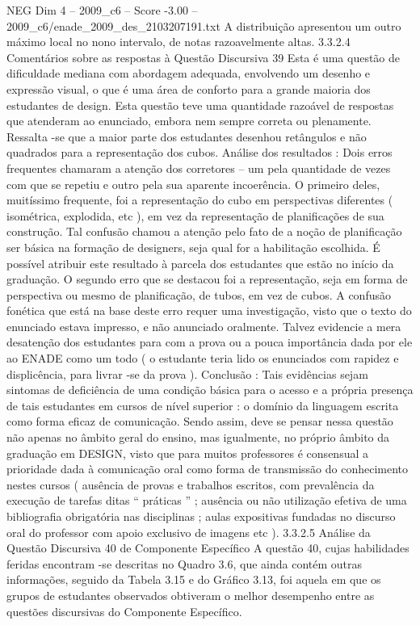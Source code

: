\begin{textsample}{NEG Dim 4 – 2009\_c6 – Score -3.00 – 2009\_c6/enade\_2009\_des\_2103207191.txt}
A distribuição apresentou um outro máximo local no nono intervalo, de notas razoavelmente altas. 3.3.2.4 Comentários sobre as respostas à Questão Discursiva 39 Esta é uma questão de dificuldade mediana com abordagem adequada, envolvendo um desenho e expressão visual, o que é uma área de conforto para a grande maioria dos estudantes de design.
Esta questão teve uma quantidade razoável de respostas que atenderam ao enunciado, embora nem sempre correta ou plenamente.
Ressalta -se que a maior parte dos estudantes desenhou retângulos e não quadrados para a representação dos cubos.
Análise dos resultados : Dois erros frequentes chamaram a atenção dos corretores – um pela quantidade de vezes com que se repetiu e outro pela sua aparente incoerência.
O primeiro deles, muitíssimo frequente, foi a representação do cubo em perspectivas diferentes ( isométrica, explodida, etc ), em vez da representação de planificações de sua construção.
Tal confusão chamou a atenção pelo fato de a noção de planificação ser básica na formação de designers, seja qual for a habilitação escolhida.
É possível atribuir este resultado à parcela dos estudantes que estão no início da graduação.
O segundo erro que se destacou foi a representação, seja em forma de perspectiva ou mesmo de planificação, de tubos, em vez de cubos.
A confusão fonética que está na base deste erro requer uma investigação, visto que o texto do enunciado estava impresso, e não anunciado oralmente.
Talvez evidencie a mera desatenção dos estudantes para com a prova ou a pouca importância dada por ele ao ENADE como um todo ( o estudante teria lido os enunciados com rapidez e displicência, para livrar -se da prova ).
Conclusão : Tais evidências sejam sintomas de deficiência de uma condição básica para o acesso e a própria presença de tais estudantes em cursos de nível superior : o domínio da linguagem escrita como forma eficaz de comunicação.
Sendo assim, deve se pensar nessa questão não apenas no âmbito geral do ensino, mas igualmente, no próprio âmbito da graduação em DESIGN, visto que para muitos professores é consensual a prioridade dada à comunicação oral como forma de transmissão do conhecimento nestes cursos ( ausência de provas e trabalhos escritos, com prevalência da execução de tarefas ditas “ práticas ” ; ausência ou não utilização efetiva de uma bibliografia obrigatória nas disciplinas ; aulas expositivas fundadas no discurso oral do professor com apoio exclusivo de imagens etc ). 3.3.2.5 Análise da Questão Discursiva 40 de Componente Específico A questão 40, cujas habilidades feridas encontram -se descritas no Quadro 3.6, que ainda contém outras informações, seguido da Tabela 3.15 e do Gráfico 3.13, foi aquela em que os grupos de estudantes observados obtiveram o melhor desempenho entre as questões discursivas do Componente Específico.

\end{textsample}
